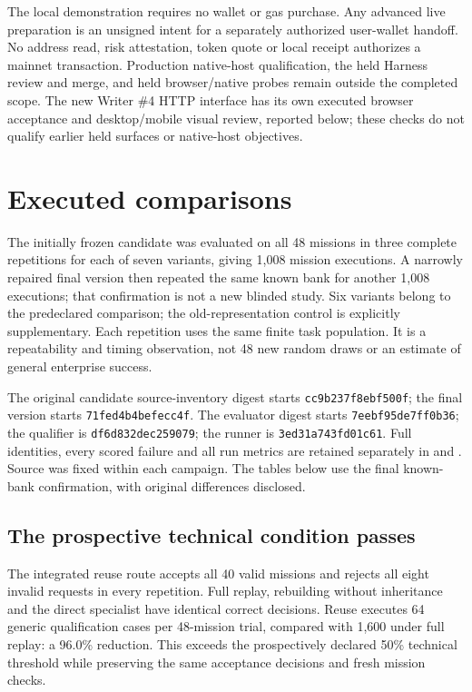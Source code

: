 \documentclass[11pt]{article}
\newcommand{\filename}[1]{\path{#1}}
\begin{document}
The local demonstration requires no wallet or gas purchase. Any advanced live preparation is an unsigned intent for a separately authorized user-wallet handoff. No address read, risk attestation, token quote or local receipt authorizes a mainnet transaction. Production native-host qualification, the held Harness review and merge, and held browser/native probes remain outside the completed scope. The new Writer \#4 HTTP interface has its own executed browser acceptance and desktop/mobile visual review, reported below; these checks do not qualify earlier held surfaces or native-host objectives.



\section{Executed comparisons}
\label{sec:results}

The initially frozen candidate was evaluated on all 48 missions in three complete repetitions for each of seven variants, giving 1,008 mission executions. A narrowly repaired final version then repeated the same known bank for another 1,008 executions; that confirmation is not a new blinded study. Six variants belong to the predeclared comparison; the old-representation control is explicitly supplementary. Each repetition uses the same finite task population. It is a repeatability and timing observation, not 48 new random draws or an estimate of general enterprise success.

The original candidate source-inventory digest starts \texttt{cc9b237f8ebf500f}; the final version starts \texttt{71fed4b4befecc4f}. The evaluator digest starts \texttt{7eebf95de7ff0b36}; the qualifier is \texttt{df6d832dec259079}; the runner is \texttt{3ed31a743fd01c61}. Full identities, every scored failure and all run metrics are retained separately in \filename{study/results/scored-v1/} and \filename{study/results/scored-v2/}. Source was fixed within each campaign. The tables below use the final known-bank confirmation, with original differences disclosed.

\subsection{The prospective technical condition passes}

The integrated reuse route accepts all 40 valid missions and rejects all eight invalid requests in every repetition. Full replay, rebuilding without inheritance and the direct specialist have identical correct decisions. Reuse executes 64 generic qualification cases per 48-mission trial, compared with 1,600 under full replay: a 96.0\% reduction. This exceeds the prospectively declared 50\% technical threshold while preserving the same acceptance decisions and fresh mission checks.
\end{document}
